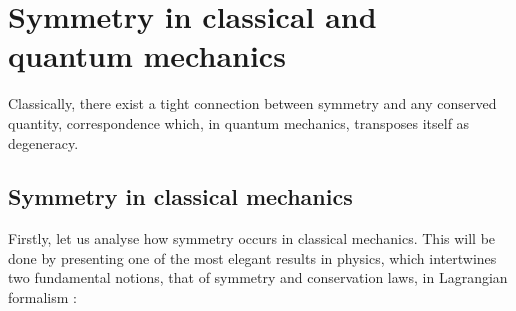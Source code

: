 \documentclass[12pt,a4paper]{report}
\theoremstyle{definition}
\theoremstyle{remark}
\theoremstyle{remark}
\begin{document}
\chapter{Symmetry in classical and quantum mechanics}
Classically, there exist a tight connection between symmetry and any conserved quantity, correspondence which, in quantum mechanics, transposes itself as degeneracy.
\section{Symmetry in classical mechanics}
Firstly, let us analyse how symmetry occurs in classical mechanics. This will be done by presenting one of the most elegant results in physics, which intertwines two fundamental notions, that of symmetry and conservation laws, in Lagrangian formalism \cite{morin}:
\end{document}
